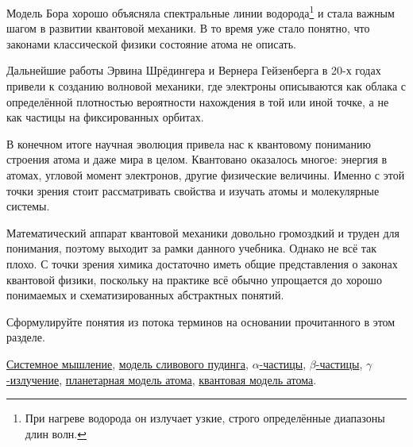 Модель Бора хорошо объясняла спектральные линии водорода\footnote{При нагреве водорода он излучает узкие, строго определённые диапазоны длин волн.} и стала важным шагом в развитии квантовой механики. В то время уже стало понятно, что законами классической физики состояние атома не описать.

Дальнейшие работы Эрвина Шрёдингера и Вернера Гейзенберга в 20-х годах привели к созданию волновой механики, где электроны описываются как облака с определённой плотностью вероятности нахождения в той или иной точке, а не как частицы на фиксированных орбитах.

В конечном итоге научная эволюция привела нас к квантовому пониманию строения атома и даже мира в целом. Квантовано оказалось многое: энергия в атомах, угловой момент электронов, другие физические величины. Именно с этой точки зрения стоит рассматривать свойства и изучать атомы и молекулярные системы.

Математический аппарат квантовой механики довольно громоздкий и труден для понимания, поэтому выходит за рамки данного учебника. Однако не всё так плохо. С точки зрения химика достаточно иметь общие представления о законах квантовой физики, поскольку на практике всё обычно упрощается до хорошо понимаемых и схематизированных абстрактных понятий.

Сформулируйте понятия из потока терминов на основании прочитанного в этом разделе.

\begin{termlist}
    \hyperref[term:systematic_thinking]{Системное мышление},
    \hyperref[term:plum_pudding]{модель сливового пудинга},
    \hyperref[term:alpha_particle]{$\alpha$-частицы},
    \hyperref[term:beta_particle]{$\beta$-частицы},
    \hyperref[term:gamma_radiation]{$\gamma$-излучение},
    \hyperref[term:planetary_model]{планетарная модель атома},
    \hyperref[term:quantum_model_of_the_atom]{квантовая модель атома}.
\end{termlist}

